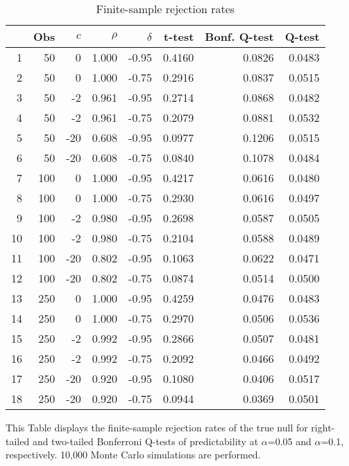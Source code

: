 \documentclass{article}
\begin{document}
\begin{table}[hb!]
\caption{Finite-sample rejection rates}
\label{tab:cy}
\centering

\begin{threeparttable}
\begin{tabular}{rrrrrrrr}
 \hline
 & Obs & $c$ & $\rho$ & $\delta$ & t-test & Bonf. Q-test & Q-test \\ 
  \hline
1 & 50 & 0 & 1.000 & -0.95 & 0.4160 & 0.0826 & 0.0483 \\ 
  2 & 50 & 0 & 1.000 & -0.75 & 0.2916 & 0.0837 & 0.0515 \\ 
  3 & 50 & -2 & 0.961 & -0.95 & 0.2714 & 0.0868 & 0.0482 \\ 
  4 & 50 & -2 & 0.961 & -0.75 & 0.2079 & 0.0881 & 0.0532 \\ 
  5 & 50 & -20 & 0.608 & -0.95 & 0.0977 & 0.1206 & 0.0515 \\ 
  6 & 50 & -20 & 0.608 & -0.75 & 0.0840 & 0.1078 & 0.0484 \\ 
  7 & 100 & 0 & 1.000 & -0.95 & 0.4217 & 0.0616 & 0.0480 \\ 
  8 & 100 & 0 & 1.000 & -0.75 & 0.2930 & 0.0616 & 0.0497 \\ 
  9 & 100 & -2 & 0.980 & -0.95 & 0.2698 & 0.0587 & 0.0505 \\ 
  10 & 100 & -2 & 0.980 & -0.75 & 0.2104 & 0.0588 & 0.0489 \\ 
  11 & 100 & -20 & 0.802 & -0.95 & 0.1063 & 0.0622 & 0.0471 \\ 
  12 & 100 & -20 & 0.802 & -0.75 & 0.0874 & 0.0514 & 0.0500 \\ 
  13 & 250 & 0 & 1.000 & -0.95 & 0.4259 & 0.0476 & 0.0483 \\ 
  14 & 250 & 0 & 1.000 & -0.75 & 0.2970 & 0.0506 & 0.0536 \\ 
  15 & 250 & -2 & 0.992 & -0.95 & 0.2866 & 0.0507 & 0.0481 \\ 
  16 & 250 & -2 & 0.992 & -0.75 & 0.2092 & 0.0466 & 0.0492 \\ 
  17 & 250 & -20 & 0.920 & -0.95 & 0.1080 & 0.0406 & 0.0517 \\ 
  18 & 250 & -20 & 0.920 & -0.75 & 0.0944 & 0.0369 & 0.0501 \\ 
   \hline
\end{tabular}
 \begin{tablenotes}
 \small
\item This Table displays the finite-sample rejection rates of the true null for right-tailed and two-tailed Bonferroni Q-tests of predictability at $\alpha$=0.05 and $\alpha$=0.1, respectively. 10,000 Monte Carlo simulations are performed.
\end{tablenotes}
\end{threeparttable}
\end{table}
\end{document}
